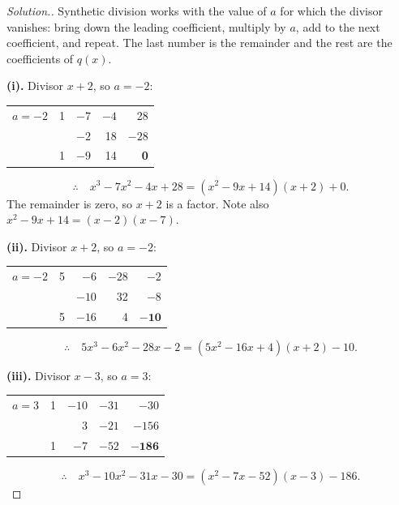 \documentclass[11pt,a4paper]{article}
\theoremstyle{definition}
\newenvironment{solution}
  {\renewcommand{\qedsymbol}{}\begin{proof}[\textit{Solution}.]}
  {\end{proof}}
\begin{document}
\begin{solution}
Synthetic division works with the value of $a$ for which the divisor vanishes: bring
down the leading coefficient, multiply by $a$, add to the next coefficient, and repeat.
The last number is the remainder and the rest are the coefficients of $q(x)$.

\textbf{(i).} Divisor $x+2$, so $a=-2$:

\begin{table}[H]
\centering
\begin{tabular}{|c|r r r r|}
\hline
$a=-2$ & 1 & $-7$ & $-4$ & 28\\
       &   & $-2$ & 18 & $-28$\\
\hline
       & 1 & $-9$ & 14 & \textbf{0}\\
\hline
\end{tabular}
\end{table}

$$\therefore\quad x^3-7x^2-4x+28=\left(x^2-9x+14\right)(x+2)+0.$$
The remainder is zero, so $x+2$ is a factor. Note also
$x^2-9x+14=(x-2)(x-7)$.

\textbf{(ii).} Divisor $x+2$, so $a=-2$:

\begin{table}[H]
\centering
\begin{tabular}{|c|r r r r|}
\hline
$a=-2$ & 5 & $-6$ & $-28$ & $-2$\\
       &   & $-10$ & 32 & $-8$\\
\hline
       & 5 & $-16$ & 4 & $\mathbf{-10}$\\
\hline
\end{tabular}
\end{table}

$$\therefore\quad 5x^3-6x^2-28x-2=\left(5x^2-16x+4\right)(x+2)-10.$$

\textbf{(iii).} Divisor $x-3$, so $a=3$:

\begin{table}[H]
\centering
\begin{tabular}{|c|r r r r|}
\hline
$a=3$ & 1 & $-10$ & $-31$ & $-30$\\
      &   & 3 & $-21$ & $-156$\\
\hline
      & 1 & $-7$ & $-52$ & $\mathbf{-186}$\\
\hline
\end{tabular}
\end{table}

$$\therefore\quad x^3-10x^2-31x-30=\left(x^2-7x-52\right)(x-3)-186.$$


\end{solution}
\end{document}
